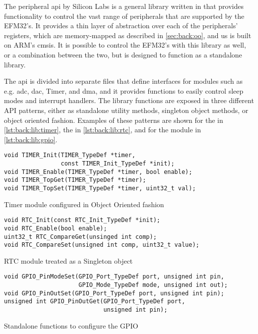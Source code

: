 The {\emlib} peripheral \gls{api} by Silicon Labs is a general library written in {\C} that provides functionality to control the vast range of peripherals that are supported by the EFM32's.
It provides a thin layer of abstraction over each of the peripherals' registers, which are memory-mapped as described in \autoref{sec:back:oo}, and us is built on ARM's \gls{cmsis}.
It is possible to control the EFM32's with this library as well, or a combination between the two, but {\emlib} is designed to function as a standalone library.

The \gls{api} is divided into separate files that define interfaces for modules such as e.g. \gls{adc}, \gls{dac}, Timer, and \gls{dma}, and it provides functions to easily control sleep modes and interrupt handlers.
The library functions are exposed in three different API patterns, either as standalone utility methods, singleton object methods, or {\C} object oriented fashion.
Examples of these patterns are shown for the  in \autoref{lst:back:lib:timer}, the  in \autoref{lst:back:lib:rtc}, and for the  module in \autoref{lst:back:lib:gpio}.

\begin{listing}[H]
  \begin{verbatim}
void TIMER_Init(TIMER_TypeDef *timer,
                const TIMER_Init_TypeDef *init);
void TIMER_Enable(TIMER_TypeDef *timer, bool enable);
void TIMER_TopGet(TIMER_TypeDef *timer);
void TIMER_TopSet(TIMER_TypeDef *timer, uint32_t val);
  \end{verbatim}
  \caption{Timer module configured in {\C} Object Oriented fashion}
  \label{lst:back:lib:timer}
\end{listing}

\begin{listing}[H]
  \begin{verbatim}
void RTC_Init(const RTC_Init_TypeDef *init);
void RTC_Enable(bool enable);
uint32_t RTC_CompareGet(unsinged int comp);
void RTC_CompareSet(unsigned int comp, uint32_t value);
  \end{verbatim}
  \caption{RTC module treated as a Singleton object}
  \label{lst:back:lib:rtc}
\end{listing}

\begin{listing}[H]
  \begin{verbatim}
void GPIO_PinModeSet(GPIO_Port_TypeDef port, unsigned int pin,
                     GPIO_Mode_TypeDef mode, unsigned int out);
void GPIO_PinOutSet(GPIO_Port_TypeDef port, unsigned int pin);
unsigned int GPIO_PinOutGet(GPIO_Port_TypeDef port,
                            unsigned int pin);
  \end{verbatim}
  \caption{Standalone functions to configure the GPIO}
  \label{lst:back:lib:gpio}
\end{listing}

